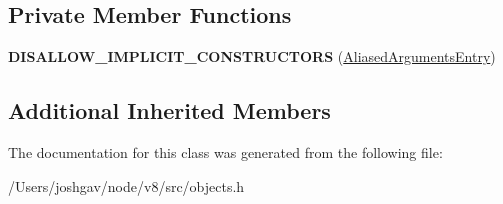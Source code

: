 \subsection*{Private Member Functions}
\begin{DoxyCompactItemize}
\item 
{\bfseries D\+I\+S\+A\+L\+L\+O\+W\+\_\+\+I\+M\+P\+L\+I\+C\+I\+T\+\_\+\+C\+O\+N\+S\+T\+R\+U\+C\+T\+O\+RS} (\hyperlink{classv8_1_1internal_1_1_aliased_arguments_entry}{Aliased\+Arguments\+Entry})\hypertarget{classv8_1_1internal_1_1_aliased_arguments_entry_a0fc1be43c76bf0470598d5ad8f9b7419}{}\label{classv8_1_1internal_1_1_aliased_arguments_entry_a0fc1be43c76bf0470598d5ad8f9b7419}

\end{DoxyCompactItemize}
\subsection*{Additional Inherited Members}


The documentation for this class was generated from the following file\+:\begin{DoxyCompactItemize}
\item 
/\+Users/joshgav/node/v8/src/objects.\+h\end{DoxyCompactItemize}
